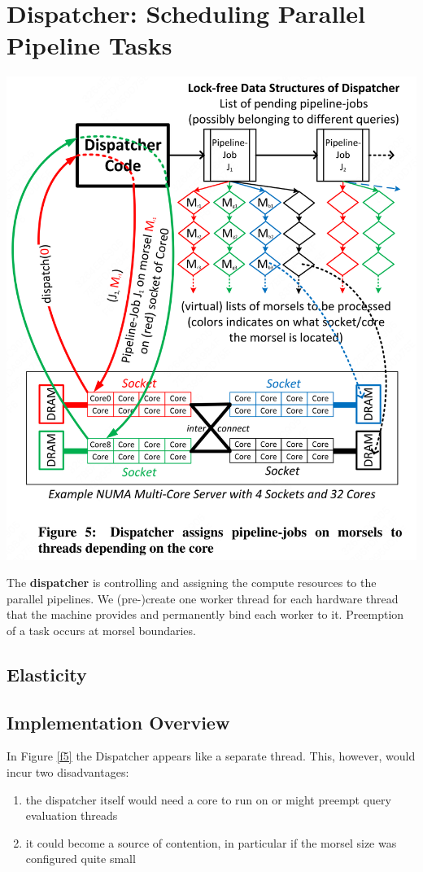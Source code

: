 \documentclass[11pt]{article}
\begin{document}
\section{Dispatcher: Scheduling Parallel Pipeline Tasks}
\label{sec:orgb8556bf}
\begin{center}
\includegraphics[width=.7\textwidth]{../../images/papers/155.png}
\label{f5}
\end{center}

The \textbf{dispatcher} is controlling and assigning the compute resources to the parallel pipelines. We
(pre-)create one worker thread for each hardware thread that the machine provides and permanently
bind each worker to it. Preemption of a task occurs at morsel boundaries.
\subsection{Elasticity}
\label{sec:org2b35261}
\subsection{Implementation Overview}
\label{sec:org1b88993}
In Figure \ref{f5} the Dispatcher appears like a separate thread. This, however, would incur two
disadvantages:
\begin{enumerate}
\item the dispatcher itself would need a core to run on or might preempt query evaluation threads
\item it could become a source of contention, in particular if the morsel size was configured quite small
\end{enumerate}
\end{document}
